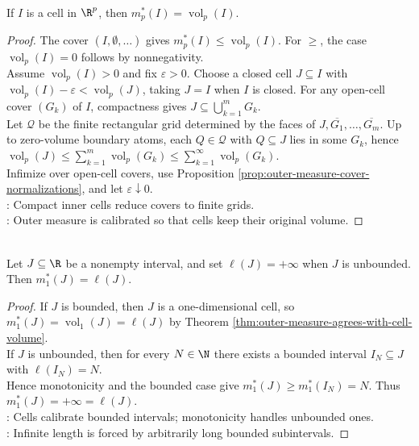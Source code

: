 \begin{theorem} \label{thm:outer-measure-agrees-with-cell-volume} \\
If $I$ is a cell in $\R^p$, then $m_p^\ast(I)=\operatorname{vol}_p(I)$.
\begin{proof}
The cover $(I,\emptyset,\ldots)$ gives $m_p^\ast(I)\leq\operatorname{vol}_p(I)$. For $\geq$, the case $\operatorname{vol}_p(I)=0$ follows by nonnegativity.\\
Assume $\operatorname{vol}_p(I)>0$ and fix $\varepsilon>0$. Choose a closed cell $J\subseteq I$ with $\operatorname{vol}_p(I)-\varepsilon<\operatorname{vol}_p(J)$, taking $J=I$ when $I$ is closed. For any open-cell cover $(G_k)$ of $I$, compactness gives $J\subseteq\bigcup_{k=1}^{m}G_k$.\\
Let $\mathcal{Q}$ be the finite rectangular grid determined by the faces of $J,\overline{G_1},\ldots,\overline{G_m}$. Up to zero-volume boundary atoms, each $Q\in\mathcal{Q}$ with $Q\subseteq J$ lies in some $G_k$, hence $\operatorname{vol}_p(J)\leq\sum_{k=1}^{m}\operatorname{vol}_p(G_k)\leq\sum_{k=1}^{\infty}\operatorname{vol}_p(G_k)$.\\
Infimize over open-cell covers, use Proposition \ref{prop:outer-measure-cover-normalizations}, and let $\varepsilon\downarrow0$.\\
: Compact inner cells reduce covers to finite grids.\\
: Outer measure is calibrated so that cells keep their original volume.
\end{proof}
\end{theorem}

\begin{corollary} \label{cor:real-line-interval-outer-measure-length} \\
Let $J\subseteq\R$ be a nonempty interval, and set $\ell(J)=+\infty$ when $J$ is unbounded. Then $m_1^\ast(J)=\ell(J)$.
\begin{proof}
If $J$ is bounded, then $J$ is a one-dimensional cell, so $m_1^\ast(J)=\operatorname{vol}_1(J)=\ell(J)$ by Theorem \ref{thm:outer-measure-agrees-with-cell-volume}.\\
If $J$ is unbounded, then for every $N\in\N$ there exists a bounded interval $I_N\subseteq J$ with $\ell(I_N)=N$.\\
Hence monotonicity and the bounded case give $m_1^\ast(J)\geq m_1^\ast(I_N)=N$. Thus $m_1^\ast(J)=+\infty=\ell(J)$.\\
: Cells calibrate bounded intervals; monotonicity handles unbounded ones.\\
: Infinite length is forced by arbitrarily long bounded subintervals.
\end{proof}
\end{corollary}

